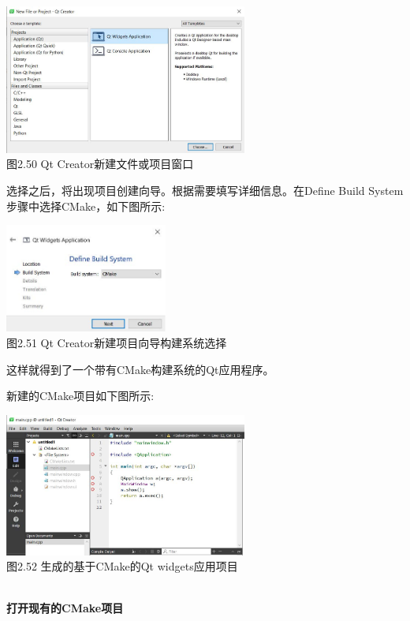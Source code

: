 \begin{center}
\includegraphics[width=0.6\textwidth]{content/1/chapter2/images/50.jpg}\\
图2.50  Qt Creator新建文件或项目窗口
\end{center}

选择之后，将出现项目创建向导。根据需要填写详细信息。在Define Build System步骤中选择CMake，如下图所示:

\begin{center}
\includegraphics[width=0.4\textwidth]{content/1/chapter2/images/51.jpg}\\
图2.51  Qt Creator新建项目向导构建系统选择
\end{center}

这样就得到了一个带有CMake构建系统的Qt应用程序。

新建的CMake项目如下图所示:

\begin{center}
\includegraphics[width=0.6\textwidth]{content/1/chapter2/images/52.jpg}\\
图2.52 生成的基于CMake的Qt widgets应用项目
\end{center}

\hspace*{\fill} \\ %
\noindent
\textbf{打开现有的CMake项目}


